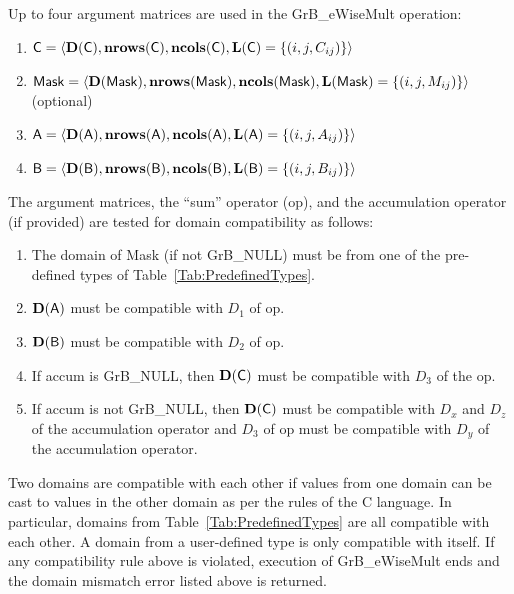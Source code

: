 Up to four argument matrices are used in the {\sf GrB\_eWiseMult} operation:
\begin{enumerate}
	\item ${\sf C} = \langle \bold{D}({\sf C}),\bold{nrows}({\sf C}),\bold{ncols}({\sf C}),\bold{L}({\sf C}) = \{(i,j,C_{ij}) \} \rangle$
	\item ${\sf Mask} = \langle \bold{D}({\sf Mask}),\bold{nrows}({\sf Mask}),\bold{ncols}({\sf Mask}),\bold{L}({\sf Mask}) = \{(i,j,M_{ij}) \} \rangle$ (optional)
	\item ${\sf A} = \langle \bold{D}({\sf A}),\bold{nrows}({\sf A}), \bold{ncols}({\sf A}),\bold{L}({\sf A}) = \{(i,j,A_{ij}) \} \rangle$
	\item ${\sf B} = \langle \bold{D}({\sf B}),\bold{nrows}({\sf B}), \bold{ncols}({\sf B}),\bold{L}({\sf B}) = \{(i,j,B_{ij}) \} \rangle$
\end{enumerate}

The argument matrices, the ``sum'' operator ({\sf op}), and the accumulation 
operator (if provided) are tested for domain compatibility as follows:
\begin{enumerate}
	\item The domain of {\sf Mask} (if not {\sf GrB\_NULL}) must be from one of the pre-defined types of Table~\ref{Tab:PredefinedTypes}.

	\item $\bold{D}({\sf A})$ must be compatible with $D_1$ of {\sf op}.

	\item $\bold{D}({\sf B})$ must be compatible with $D_2$ of {\sf op}.

	\item If {\sf accum} is {\sf GrB\_NULL}, then $\bold{D}({\sf C})$ must be 
    compatible with $D_3$ of the {\sf op}.

	\item If {\sf accum} is not {\sf GrB\_NULL}, then $\bold{D}({\sf C})$ must be
    compatible with $D_x$ and $D_z$ of the accumulation operator and $D_3$ of
    {\sf op} must be compatible with $D_y$ of the accumulation operator.
\end{enumerate}
Two domains are compatible with each other if values from one domain can be cast 
to values in the other domain as per the rules of the C language.
In particular, domains from Table~\ref{Tab:PredefinedTypes} are all compatible 
with each other. A domain from a user-defined type is only compatible with itself.
If any compatibility rule above is violated, execution of {\sf GrB\_eWiseMult} ends
and the domain mismatch error listed above is returned.

